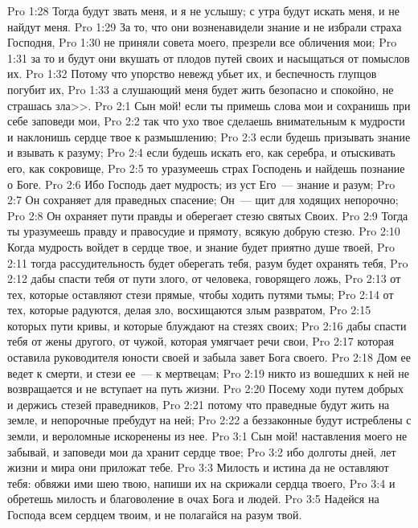 \vs Pro 1:28 Тогда будут звать меня, и я не услышу; с утра будут искать меня, и не найдут меня.
\vs Pro 1:29 За то, что они возненавидели знание и не избрали  страха Господня,
\vs Pro 1:30 не приняли совета моего, презрели все обличения мои;
\vs Pro 1:31 за то и будут они вкушать от плодов путей своих и насыщаться от помыслов их.
\vs Pro 1:32 Потому что упорство невежд убьет их, и беспечность глупцов погубит их,
\vs Pro 1:33 а слушающий меня будет жить безопасно и спокойно, не страшась зла>>.
\vs Pro 2:1 Сын мой! если ты примешь слова мои и сохранишь при себе заповеди мои,
\vs Pro 2:2 так что ухо твое сделаешь внимательным к мудрости и наклонишь сердце твое к размышлению;
\vs Pro 2:3 если будешь призывать знание и взывать к разуму;
\vs Pro 2:4 если будешь искать его, как серебра, и отыскивать его, как сокровище,
\vs Pro 2:5 то уразумеешь страх Господень и найдешь познание о Боге.
\vs Pro 2:6 Ибо Господь дает мудрость; из уст Его~--- знание и разум;
\vs Pro 2:7 Он сохраняет для праведных спасение; Он~--- щит для ходящих непорочно;
\vs Pro 2:8 Он охраняет пути правды и оберегает стезю святых Своих.
\vs Pro 2:9 Тогда ты уразумеешь правду и правосудие и прямоту, всякую добрую стезю.
\vs Pro 2:10 Когда мудрость войдет в сердце твое, и знание будет приятно душе твоей,
\vs Pro 2:11 тогда рассудительность будет оберегать тебя, разум будет охранять тебя,
\vs Pro 2:12 дабы спасти тебя от пути злого, от человека, говорящего ложь,
\vs Pro 2:13 от тех, которые оставляют стези прямые, чтобы ходить путями тьмы;
\vs Pro 2:14 от тех, которые радуются, делая зло, восхищаются злым развратом,
\vs Pro 2:15 которых пути кривы, и которые блуждают на стезях своих;
\vs Pro 2:16 дабы спасти тебя от жены другого, от чужой, которая умягчает речи свои,
\vs Pro 2:17 которая оставила руководителя юности своей и забыла завет Бога своего.
\vs Pro 2:18 Дом ее ведет к смерти, и стези ее~--- к мертвецам;
\vs Pro 2:19 никто из вошедших к ней не возвращается и не вступает на путь жизни.
\vs Pro 2:20 Посему ходи путем добрых и держись стезей праведников,
\vs Pro 2:21 потому что праведные будут жить на земле, и непорочные пребудут на ней;
\vs Pro 2:22 а беззаконные будут истреблены с земли, и вероломные искоренены из нее.
\vs Pro 3:1 Сын мой! наставления моего не забывай, и заповеди мои да хранит сердце твое;
\vs Pro 3:2 ибо долготы дней, лет жизни и мира они приложат тебе.
\vs Pro 3:3 Милость и истина да не оставляют тебя: обвяжи ими шею твою, напиши их на скрижали сердца твоего,
\vs Pro 3:4 и обретешь милость и благоволение в очах Бога и людей.
\vs Pro 3:5 Надейся на Господа всем сердцем твоим, и не полагайся на разум твой.
